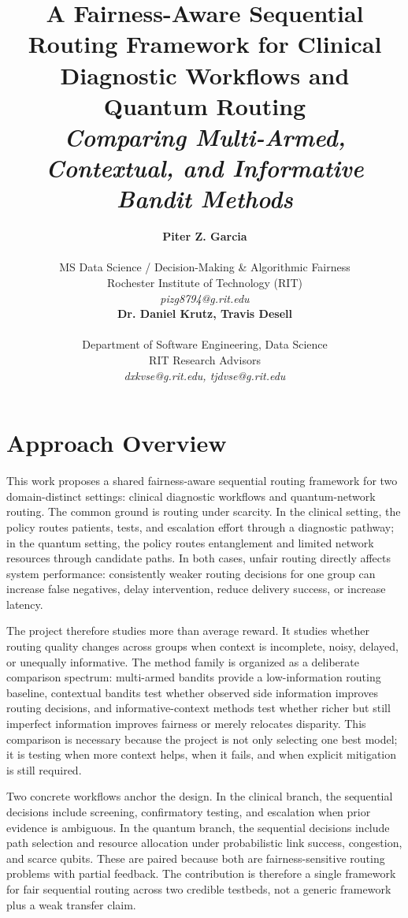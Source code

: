 \documentclass{IEEEtran}
\title{A Fairness-Aware Sequential Routing Framework for Clinical Diagnostic Workflows and Quantum Routing\\[0.3em]
{\large\textit{Comparing Multi-Armed, Contextual, and Informative Bandit Methods}}}
\author{%
\begin{minipage}{0.48\textwidth}
\begin{center}
{\bf Piter Z. Garcia}\\
\begin{small}
MS Data Science / Decision-Making \& Algorithmic Fairness\\
Rochester Institute of Technology (RIT)\\
{\it pizg8794@g.rit.edu}
\end{small}
\end{center}
\end{minipage}
\hfill
\begin{minipage}{0.48\textwidth}
\begin{center}
{\bf Dr. Daniel Krutz, Travis Desell}\\
\begin{small}
Department of Software Engineering, Data Science\\
RIT Research Advisors\\
{\it dxkvse@g.rit.edu, tjdvse@g.rit.edu}
\end{small}
\end{center}
\end{minipage}%
}
\begin{document}
\maketitle
\vspace{-0.7em}

\section{Approach Overview}
This work proposes a shared fairness-aware sequential routing framework for two domain-distinct settings: clinical diagnostic workflows and quantum-network routing. The common ground is routing under scarcity. In the clinical setting, the policy routes patients, tests, and escalation effort through a diagnostic pathway; in the quantum setting, the policy routes entanglement and limited network resources through candidate paths. In both cases, unfair routing directly affects system performance: consistently weaker routing decisions for one group can increase false negatives, delay intervention, reduce delivery success, or increase latency.

The project therefore studies more than average reward. It studies whether routing quality changes across groups when context is incomplete, noisy, delayed, or unequally informative. The method family is organized as a deliberate comparison spectrum: multi-armed bandits provide a low-information routing baseline, contextual bandits test whether observed side information improves routing decisions, and informative-context methods test whether richer but still imperfect information improves fairness or merely relocates disparity. This comparison is necessary because the project is not only selecting one best model; it is testing when more context helps, when it fails, and when explicit mitigation is still required.

Two concrete workflows anchor the design. In the clinical branch, the sequential decisions include screening, confirmatory testing, and escalation when prior evidence is ambiguous. In the quantum branch, the sequential decisions include path selection and resource allocation under probabilistic link success, congestion, and scarce qubits. These are paired because both are fairness-sensitive routing problems with partial feedback. The contribution is therefore a single framework for fair sequential routing across two credible testbeds, not a generic framework plus a weak transfer claim.
\end{document}
